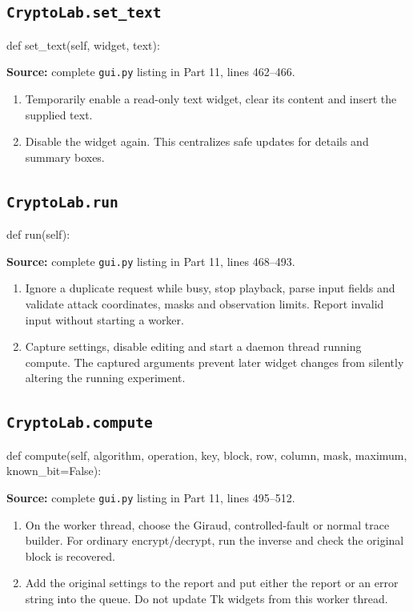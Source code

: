 \subsection{\texttt{CryptoLab.set\_\allowbreak{}text}}
\begin{lightcode}
def set_text(self, widget, text):
\end{lightcode}
\noindent\textbf{Source:} complete \texttt{gui.py} listing in Part 11, lines 462--466.
\begin{enumerate}
\item Temporarily enable a read-only text widget, clear its content and insert the supplied text.
\item Disable the widget again. This centralizes safe updates for details and summary boxes.
\end{enumerate}
\subsection{\texttt{CryptoLab.run}}
\begin{lightcode}
def run(self):
\end{lightcode}
\noindent\textbf{Source:} complete \texttt{gui.py} listing in Part 11, lines 468--493.
\begin{enumerate}
\item Ignore a duplicate request while busy, stop playback, parse input fields and validate attack coordinates, masks and observation limits. Report invalid input without starting a worker.
\item Capture settings, disable editing and start a daemon thread running compute. The captured arguments prevent later widget changes from silently altering the running experiment.
\end{enumerate}
\subsection{\texttt{CryptoLab.compute}}
\begin{lightcode}
def compute(self, algorithm, operation, key, block, row, column, mask, maximum, known_bit=False):
\end{lightcode}
\noindent\textbf{Source:} complete \texttt{gui.py} listing in Part 11, lines 495--512.
\begin{enumerate}
\item On the worker thread, choose the Giraud, controlled-fault or normal trace builder. For ordinary encrypt/decrypt, run the inverse and check the original block is recovered.
\item Add the original settings to the report and put either the report or an error string into the queue. Do not update Tk widgets from this worker thread.
\end{enumerate}
